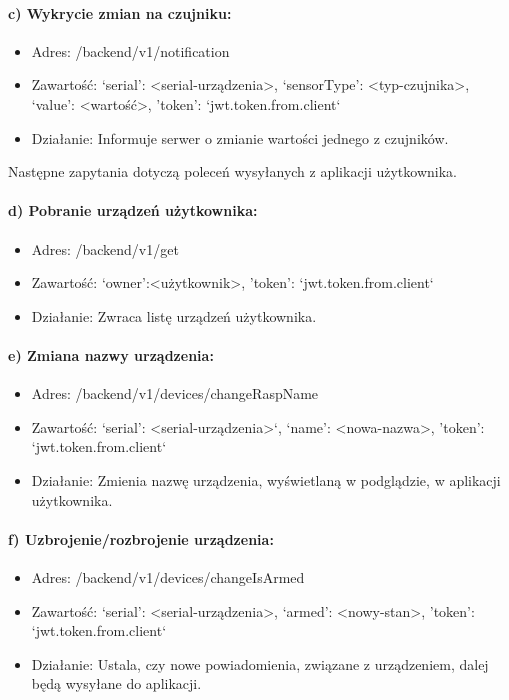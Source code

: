 \paragraph{c) Wykrycie zmian na czujniku:}
\begin{itemize}
\item Adres: /backend/v1/notification
\item Zawartość: {‘serial’: <serial-urządzenia>, ‘sensorType’: <typ-czujnika>, 
‘value’: <wartość>, 'token': `jwt.token.from.client`}
\item Działanie: Informuje serwer o zmianie wartości jednego z czujników.
\end{itemize}
Następne zapytania dotyczą poleceń wysyłanych z aplikacji użytkownika.
\paragraph{d) Pobranie urządzeń użytkownika:}
\begin{itemize}
\item Adres: /backend/v1/get
\item Zawartość: {‘owner’:<użytkownik>, 'token': `jwt.token.from.client`}
\item Działanie: Zwraca listę urządzeń użytkownika.
\end{itemize}
\paragraph{e) Zmiana nazwy urządzenia:}
\begin{itemize}
\item Adres: /backend/v1/devices/changeRaspName
\item Zawartość: {‘serial’: <serial-urządzenia>‘, ‘name’: <nowa-nazwa>, 
'token': `jwt.token.from.client`}
\item Działanie: Zmienia nazwę urządzenia, wyświetlaną w podglądzie, w aplikacji użytkownika.
\end{itemize}
\paragraph{f) Uzbrojenie/rozbrojenie urządzenia:}
\begin{itemize}
\item Adres: /backend/v1/devices/changeIsArmed
\item Zawartość: {‘serial’: <serial-urządzenia>, ‘armed’: <nowy-stan>, 
'token': `jwt.token.from.client`}
\item Działanie: Ustala, czy nowe powiadomienia, związane z urządzeniem, dalej będą wysyłane do aplikacji.
\end{itemize}
